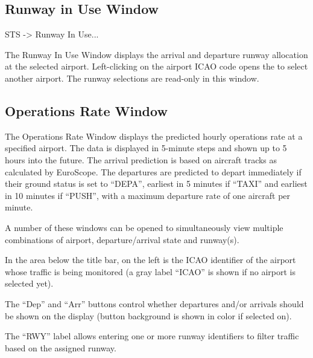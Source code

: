 \documentclass[a4paper,oneside,11pt]{memoir}
\begin{document}
\subsection{Runway in Use Window}
\label{win:riuw}

 STS -> Runway In Use...

\bigskip


The Runway In Use Window displays the arrival and departure runway allocation at the selected airport. Left-clicking on the airport ICAO code opens the  to select another airport. The runway selections are read-only in this window.

\subsection{Operations Rate Window}
\label{win:orw}

\bigskip


The Operations Rate Window displays the predicted hourly operations rate at a specified airport. The data is displayed in 5-minute steps and shown up to 5 hours into the future. The arrival prediction is based on aircraft tracks as calculated by EuroScope. The departures are predicted to depart immediately if their ground status is set to “DEPA”, earliest in 5 minutes if “TAXI” and earliest in 10 minutes if “PUSH”, with a maximum departure rate of one aircraft per minute.

\bigskip

A number of these windows can be opened to simultaneously view multiple combinations of airport, departure/arrival state and runway(s).

\bigskip

In the area below the title bar, on the left is the ICAO identifier of the airport whose traffic is being monitored (a gray label “ICAO” is shown if no airport is selected yet).

\bigskip

The “Dep” and “Arr” buttons control whether departures and/or arrivals should be shown on the display (button background is shown in  color if selected on).

\bigskip

The “RWY” label allows entering one or more runway identifiers to filter traffic based on the assigned runway.
\end{document}
